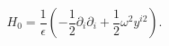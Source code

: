 \begin{equation}
H_0 = \frac{1}{\epsilon}(-\frac{1}{2}\partial_i\partial_i + \frac{1}{2}\omega^2y^{i2}) .
\label{2.14c}
\end{equation}

